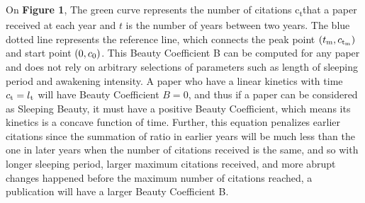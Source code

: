 \documentclass[utf8]{frontiersSCNS}
\begin{document}
{On  \textbf{Figure 1}, The green curve represents the number of citations c\textsubscript{t}that a paper received at each year and $t$ is the number of years between two years. The blue dotted line represents the reference line, which connects the peak point $(t\textsubscript{m}, c\textsubscript{t\textsubscript{m}})$ and start point $(0, c\textsubscript{0})$. This Beauty Coefficient B can be computed for any paper and does not rely on arbitrary selections of parameters such as length of sleeping period and awakening intensity. A paper who have a linear kinetics with time $c\textsubscript{t} = l\textsubscript{t}$ will have Beauty Coefficient $B = 0$, and thus if a paper can be considered as Sleeping Beauty, it must have a positive Beauty Coefficient, which means its kinetics is a concave function of time. Further, this equation penalizes earlier citations since the summation of ratio in earlier years will be much less than the one in later years when the number of citations received is the same, and so with longer sleeping period, larger maximum citations received, and more abrupt changes happened before the maximum number of citations reached, a publication will have a larger Beauty Coefficient B. 

}
\end{document}
